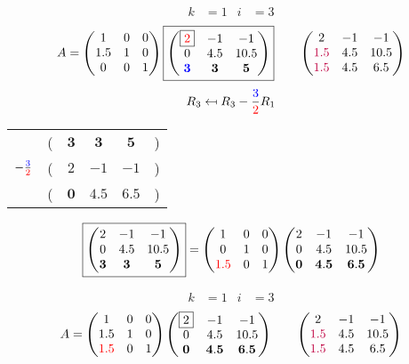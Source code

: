 \documentclass[pdf]{beamer}
\begin{document}
\begin{frame}{}\begin{align*} k &= 1 & i &= 3 \end{align*} $$A=\begin{pmatrix}1&0&0\\1.5&1&0\\0&0&1\end{pmatrix} \boxed{\begin{pmatrix}\boxed{{\color{red}2}}&-1&-1\\0&4.5&10.5\\\mathbf{{\color{blue}3}}&\mathbf{3}&\mathbf{5}\end{pmatrix}} \quad\quad \begin{pmatrix}2&-1&-1\\{\color{purple}1.5}&4.5&10.5\\{\color{purple}1.5}&4.5&6.5\end{pmatrix}$$ $$R_3 \mapsfrom R_3 - \frac{{\color{blue}3}}{{\color{red}2}} R_1$$ \begin{center}\begin{tabular}{cccccc}  &(& $ \mathbf{3} $ & $ \mathbf{3} $ & $ \mathbf{5} $ &)\\$ -\frac{{\color{blue}3}}{{\color{red}2}} $&(& $ 2 $ & $ -1 $ & $ -1 $ &)\\\hline  &(& $ \mathbf{0} $ & $ \mathbf{4.5} $ & $ \mathbf{6.5} $ &) \end{tabular}\end{center} $$ \boxed{\begin{pmatrix}2&-1&-1\\0&4.5&10.5\\\mathbf{3}&\mathbf{3}&\mathbf{5}\end{pmatrix}} = \begin{pmatrix}1&0&0\\0&1&0\\{\color{red}1.5}&0&1\end{pmatrix} \begin{pmatrix}2&-1&-1\\0&4.5&10.5\\\mathbf{0}&\mathbf{4.5}&\mathbf{6.5}\end{pmatrix} $$\end{frame}
\begin{frame}{}\begin{align*} k &= 1 & i &= 3 \end{align*}$$A=\begin{pmatrix}1&0&0\\1.5&1&0\\{\color{red}1.5}&0&1\end{pmatrix} \begin{pmatrix}\boxed{2}&-1&-1\\0&4.5&10.5\\\mathbf{0}&\mathbf{4.5}&\mathbf{6.5}\end{pmatrix} \quad\quad \begin{pmatrix}2&-1&-1\\{\color{purple}1.5}&4.5&10.5\\{\color{purple}1.5}&4.5&6.5\end{pmatrix}$$\end{frame}
\end{document}

